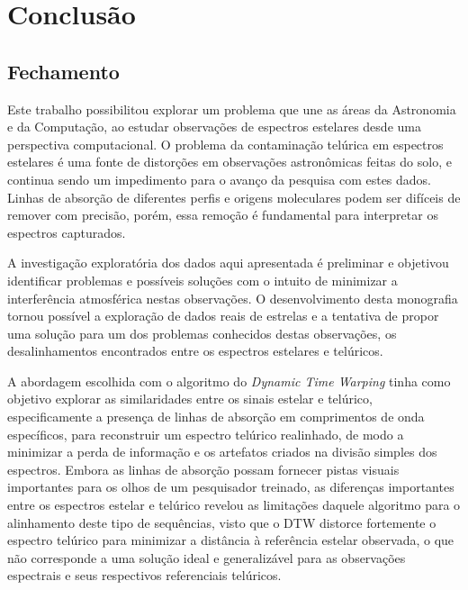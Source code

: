 \chapter{Conclusão}
\label{cap:conclusoes}

\section{Fechamento}

Este trabalho possibilitou explorar um problema que une as áreas da Astronomia e da Computação, ao estudar observações de espectros estelares desde uma perspectiva computacional. O problema da contaminação telúrica em espectros estelares é uma fonte de distorções em observações astronômicas feitas do solo, e continua sendo um impedimento para o avanço da pesquisa com estes dados. Linhas de absorção de diferentes perfis e origens moleculares podem ser difíceis de remover com precisão, porém, essa remoção é fundamental para interpretar os espectros capturados. 

A investigação exploratória dos dados aqui apresentada é preliminar e objetivou identificar problemas e possíveis soluções com o intuito de minimizar a interferência atmosférica nestas observações. O desenvolvimento desta monografia tornou possível a exploração de dados reais de estrelas e a tentativa de propor uma solução para um dos problemas conhecidos destas observações, os desalinhamentos encontrados entre os espectros estelares e telúricos.

A abordagem escolhida com o algoritmo do \textit{Dynamic Time Warping} tinha como objetivo explorar as similaridades entre os sinais estelar e telúrico, especificamente a presença de linhas de absorção em comprimentos de onda específicos, para reconstruir um espectro telúrico realinhado, de modo a minimizar a perda de informação e os artefatos criados na divisão simples dos espectros. Embora as linhas de absorção possam fornecer pistas visuais importantes para os olhos de um pesquisador treinado, as diferenças importantes entre os espectros estelar e telúrico revelou as limitações daquele algoritmo para o alinhamento deste tipo de sequências, visto que o DTW distorce fortemente o espectro telúrico para minimizar a distância à referência estelar observada, o que não corresponde a uma solução ideal e generalizável para as observações espectrais e seus respectivos referenciais telúricos.

